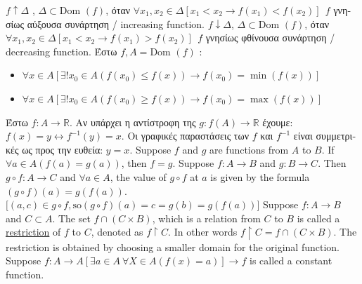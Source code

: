 \documentclass[12pt]{article}
\def\Dom{\text{Dom\ }} %
\begin{document}
\begin{flushleft}
	\textbullet \quad $\displaystyle f \uparrow \Delta$ , $\Delta \subset \Dom (f)$, \textgreek{όταν} $\forall x_1, x_2 \in \Delta [x_1 < x_2 \rightarrow f(x_1) < f(x_2)] \ \ f$ \textgreek{γνησίως αύξουσα συνάρτηση} / increasing function. \linebreak 
	\textbullet \quad $\displaystyle f \downarrow \Delta$, $\Delta \subset\Dom (f)$, \textgreek{όταν} $\forall x_1, x_2 \in \Delta [ x_1 < x_2 \rightarrow f(x_1) > f(x_2) ] \ \ f$ \textgreek{γνησίως φθίνουσα συνάρτηση} / decreasing function. \linebreak 
	\textbullet \quad \textgreek{Έστω} $f, A = \Dom (f)$  :   
	\begin{itemize}
		\renewcommand{\labelitemi}{$\rightarrow$}
	\item $\displaystyle \forall x \in A [ \exists ! x_0 \in A (f(x_0) \leq f(x) ) \rightarrow f(x_0) = \min (f(x)) ] $ 
	\item $\displaystyle \forall x \in A [ \exists ! x_0 \in A (f(x_0) \geq f(x)) \rightarrow f(x_0) = \max (f(x)) ] $ 
	\end{itemize}
	\textbullet \quad \textgreek{Έστω} $f: A \rightarrow \mathbb{R}$. \textgreek{Αν υπάρχει η αντίστροφη της} $g: f(A) \rightarrow \mathbb{R}$ \textgreek{έχουμε}: $f(x) = y \leftrightarrow f^{-1} (y) = x$. \linebreak 
	\textbullet \quad \textgreek{Οι γραφικές παραστάσεις των} $f$ \textgreek{και} $f^{-1}$ \textgreek{είναι συμμετρικές ως προς την ευθεία}: $y=x$. \linebreak 
	\textbullet \quad Suppose $f$ and $g$ are functions from $A$ to $B$. If $\forall a \in A(f(a) = g(a))$, then $f=g$. \linebreak 
	\textbullet \quad Suppose $f: A \rightarrow B $ and $g: B\rightarrow C$. Then $g\circ f: A \rightarrow C$ and $\forall a\in A$, the value of $g \circ f$ at $a$ is given by the formula $(g\circ f)(a) = g(f(a))$. \linebreak 
		$\big[(a,c) \in g\circ f, \text{so} (g\circ f)(a) = c = g(b) = g(f(a)) \big] $ \linebreak 
	\textbullet \quad Suppose $f: A \rightarrow B$ and $C \subset A$. The set $f\cap (C \times B)$, which is a relation from $C$ to $B$ is called a \uline{restriction} of $f$ to $C$, denoted as $f \upharpoonright C$. In other words $ f\upharpoonright C = f\cap (C \times B)$. The restriction is obtained by choosing a smaller domain for the original function. \linebreak 
	\textbullet \quad Suppose $f:A\rightarrow A \left[ \exists a \in A \ \forall X \in A (f(x) = a) \right] \rightarrow f$ is called a constant function. \linebreak 

\end{flushleft}
\end{document}
